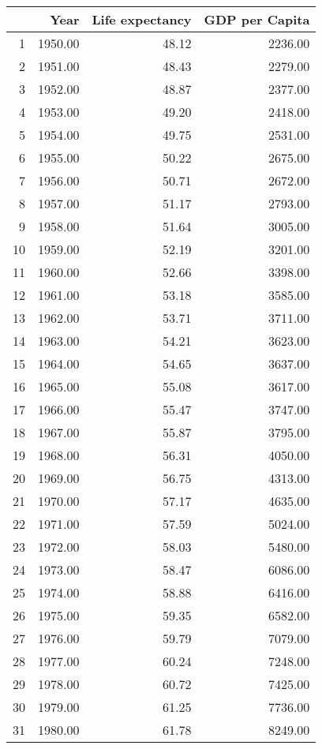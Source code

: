 \begin{longtable}{rrrr}
  \hline
 & Year & Life expectancy & GDP per Capita \\ 
  \hline
1 & 1950.00 & 48.12 & 2236.00 \\ 
  2 & 1951.00 & 48.43 & 2279.00 \\ 
  3 & 1952.00 & 48.87 & 2377.00 \\ 
  4 & 1953.00 & 49.20 & 2418.00 \\ 
  5 & 1954.00 & 49.75 & 2531.00 \\ 
  6 & 1955.00 & 50.22 & 2675.00 \\ 
  7 & 1956.00 & 50.71 & 2672.00 \\ 
  8 & 1957.00 & 51.17 & 2793.00 \\ 
  9 & 1958.00 & 51.64 & 3005.00 \\ 
  10 & 1959.00 & 52.19 & 3201.00 \\ 
  11 & 1960.00 & 52.66 & 3398.00 \\ 
  12 & 1961.00 & 53.18 & 3585.00 \\ 
  13 & 1962.00 & 53.71 & 3711.00 \\ 
  14 & 1963.00 & 54.21 & 3623.00 \\ 
  15 & 1964.00 & 54.65 & 3637.00 \\ 
  16 & 1965.00 & 55.08 & 3617.00 \\ 
  17 & 1966.00 & 55.47 & 3747.00 \\ 
  18 & 1967.00 & 55.87 & 3795.00 \\ 
  19 & 1968.00 & 56.31 & 4050.00 \\ 
  20 & 1969.00 & 56.75 & 4313.00 \\ 
  21 & 1970.00 & 57.17 & 4635.00 \\ 
  22 & 1971.00 & 57.59 & 5024.00 \\ 
  23 & 1972.00 & 58.03 & 5480.00 \\ 
  24 & 1973.00 & 58.47 & 6086.00 \\ 
  25 & 1974.00 & 58.88 & 6416.00 \\ 
  26 & 1975.00 & 59.35 & 6582.00 \\ 
  27 & 1976.00 & 59.79 & 7079.00 \\ 
  28 & 1977.00 & 60.24 & 7248.00 \\ 
  29 & 1978.00 & 60.72 & 7425.00 \\ 
  30 & 1979.00 & 61.25 & 7736.00 \\ 
  31 & 1980.00 & 61.78 & 8249.00 \\ 

\end{longtable}
